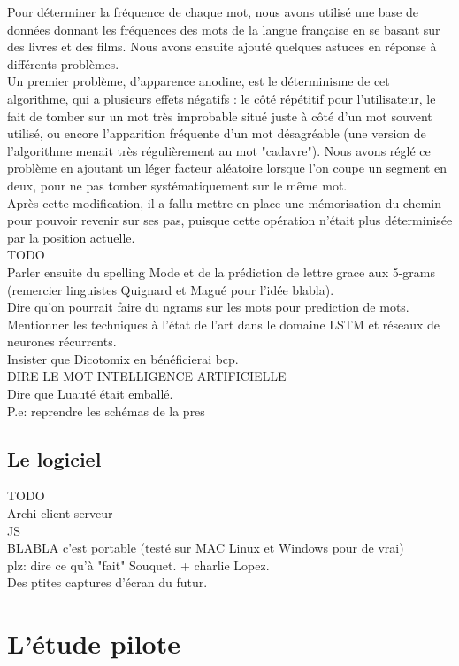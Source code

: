 \documentclass[11pt,a4paper]{article}
\theoremstyle{plain}
\theoremstyle{definition}
\begin{document}
Pour déterminer la fréquence de chaque mot, nous avons utilisé une base de données donnant les fréquences des mots de la langue française en se basant sur des livres et des films. Nous avons ensuite ajouté quelques astuces en réponse à différents problèmes.\\
Un premier problème, d'apparence anodine, est le déterminisme de cet algorithme, qui a plusieurs effets négatifs : le côté répétitif pour l'utilisateur, le fait de tomber sur un mot très improbable situé juste à côté d'un mot souvent utilisé, ou encore l'apparition fréquente d'un mot désagréable (une version de l'algorithme menait très régulièrement au mot "cadavre"). Nous avons réglé ce problème en ajoutant un léger facteur aléatoire lorsque l'on coupe un segment en deux, pour ne pas tomber systématiquement sur le même mot.\\
Après cette modification, il a fallu mettre en place une mémorisation du chemin pour pouvoir revenir sur ses pas, puisque cette opération n'était plus déterminisée par la position actuelle.\\
TODO \\
Parler ensuite du spelling Mode et de la prédiction de lettre grace aux 5-grams (remercier linguistes Quignard et Magué pour l'idée blabla).\\
Dire qu'on pourrait faire du ngrams sur les mots pour prediction de mots.\\
Mentionner les techniques à l'état de l'art dans le domaine LSTM et réseaux de neurones récurrents. \\
Insister que Dicotomix en bénéficierai bcp. \\ 
DIRE LE MOT INTELLIGENCE ARTIFICIELLE \\
Dire que Luauté était emballé.  \\
P.e: reprendre les schémas de la pres

\subsection{Le logiciel}
TODO\\
Archi client serveur \\
JS \\
BLABLA c'est portable (testé sur MAC Linux et Windows pour de vrai) \\
plz: dire ce qu'à "fait" Souquet. + charlie Lopez. \\
Des ptites captures d'écran du futur. \\

\section{L'étude pilote}
\end{document}
